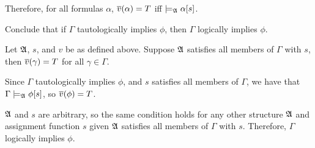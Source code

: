 \begin{problem}[3]
\begin{enumalph}
\begin{Answer}
      \step
      Therefore, for all formulas $\alpha$, $\overline{v}(\alpha) = T$ iff $\models_{\mathfrak{A}} \alpha[s]$.
    \end{Answer}


    \item Conclude that if $\Gamma$ tautologically implies $\phi$, then
      $\Gamma$ logically implies $\phi$.

      \begin{Answer}
        Let $\mathfrak{A}$, $s$, and $v$ be as defined above.
        Suppose $\mathfrak{A}$ satisfies all members of $\Gamma$ with $s$, then
        $\overline{v}(\gamma) = T$ for all $\gamma \in \Gamma$.

        \step
        Since $\Gamma$ tautologically implies $\phi$, and $s$ satisfies all members of $\Gamma$,
        we have that $\Gamma \models_{\mathfrak{A}} \phi [s]$, so $\overline{v}(\phi) = T$.

        \step
        $\mathfrak{A}$ and $s$ are arbitrary, so the same condition holds for any other
        structure $\mathfrak{A}$ and assignment function $s$ given $\mathfrak{A}$ satisfies all members of
        $\Gamma$ with $s$. Therefore, $\Gamma$ logically implies $\phi$.
      \end{Answer}
  \end{enumalph}
\end{problem}
